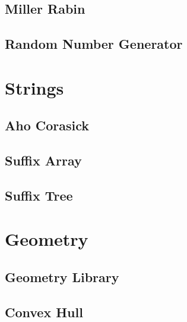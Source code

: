 \subsection{Miller Rabin}
\raggedbottom
\hrulefill
\subsection{Random Number Generator}
\raggedbottom
\hrulefill

\section{Strings}
\subsection{Aho Corasick}
\raggedbottom
\hrulefill
\subsection{Suffix Array}
\raggedbottom
\hrulefill
\subsection{Suffix Tree}
\raggedbottom
\hrulefill

\section{Geometry}
\subsection{Geometry Library}
\raggedbottom
\hrulefill
\subsection{Convex Hull}
\raggedbottom
\hrulefill

